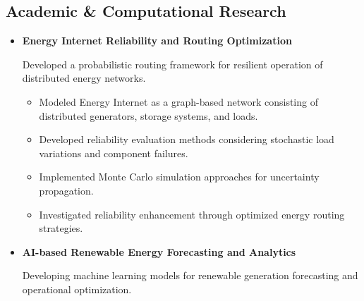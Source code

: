 \documentclass[letter,20pt]{article}
\begin{document}


\subsection*{\fontsize{10pt}{12pt}\selectfont Academic \& Computational Research}



\begin{itemize}
[
noitemsep,
topsep=5pt,
leftmargin=2ex
]



\item[]
\textbf{
Energy Internet Reliability and Routing Optimization
}


\vspace{4pt}


Developed a probabilistic routing framework for resilient operation of distributed energy networks.



\begin{itemize}
[
noitemsep,
leftmargin=4ex
]


\item
Modeled Energy Internet as a graph-based network consisting of distributed generators, storage systems, and loads.

\item
Developed reliability evaluation methods considering stochastic load variations and component failures.

\item
Implemented Monte Carlo simulation approaches for uncertainty propagation.

\item
Investigated reliability enhancement through optimized energy routing strategies.


\end{itemize}



\vspace{10pt}



\item[]
\textbf{
AI-based Renewable Energy Forecasting and Analytics
}



\vspace{4pt}


Developing machine learning models for renewable generation forecasting and operational optimization.




\end{itemize}
\end{document}
